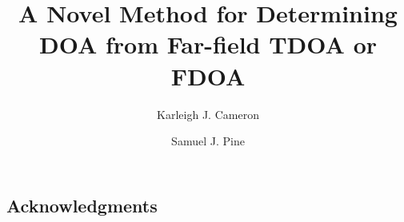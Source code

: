 \documentclass[12pt]{amsart}
\theoremstyle{definition}
\theoremstyle{remark}
\begin{document}
\title{A Novel Method for Determining DOA from Far-field TDOA or FDOA}
\author{Karleigh J. Cameron }
\author{Samuel J. Pine } %




\maketitle



%











\subsection{Acknowledgments}



\end{document}
